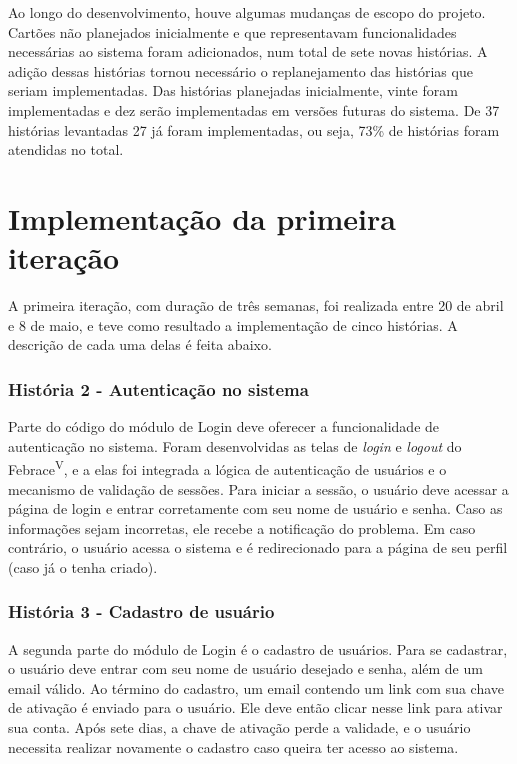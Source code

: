 \documentclass[a4paper,12pt,font=plain,header=plain]{abnt}
\begin{document}
  Ao longo do desenvolvimento, houve algumas mudanças de escopo do projeto. Cartões não planejados inicialmente e que representavam funcionalidades necessárias ao sistema foram adicionados, num total de sete novas histórias. A adição dessas histórias tornou necessário o replanejamento das histórias que seriam implementadas. Das histórias planejadas inicialmente, vinte foram implementadas e dez serão implementadas em versões futuras do sistema. De 37 histórias levantadas 27 já foram implementadas, ou seja, 73\% de histórias foram atendidas no total.

  \section{Implementação da primeira iteração}
    A primeira iteração, com duração de três semanas, foi realizada entre 20 de abril e 8 de maio, e teve como resultado a implementação de cinco histórias. A descrição de cada uma delas é feita abaixo.

    \subsubsection{História 2 - Autenticação no sistema}
      Parte do código do módulo de Login deve oferecer a funcionalidade de autenticação no sistema. Foram desenvolvidas as telas de \textit{login} e \textit{logout} do Febrace\textsuperscript{V}, e a elas foi integrada a lógica de autenticação de usuários e o mecanismo de validação de sessões. Para iniciar a sessão, o usuário deve acessar a página de login e entrar corretamente com seu nome de usuário e senha. Caso as informações sejam incorretas, ele recebe a notificação do problema. Em caso contrário, o usuário acessa o sistema e é redirecionado para a página de seu perfil (caso já o tenha criado).

    \subsubsection{História 3 - Cadastro de usuário}
      A segunda parte do módulo de Login é o cadastro de usuários. Para se cadastrar, o usuário deve entrar com seu nome de usuário desejado e senha, além de um email válido. Ao término do cadastro, um email contendo um link com sua chave de ativação é enviado para o usuário. Ele deve então clicar nesse link para ativar sua conta. Após sete dias, a chave de ativação perde a validade, e o usuário necessita realizar novamente o cadastro caso queira ter acesso ao sistema.
\end{document}
